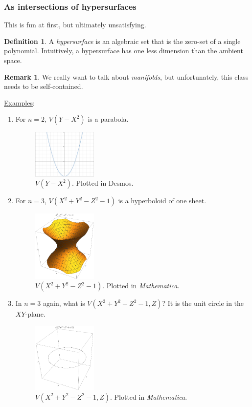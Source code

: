 \documentclass[12pt]{article}
\newcommand{\ita}[1]{\textit{#1}}
\theoremstyle{definition}
\newtheorem{definition}[theorem]{Definition}
\newtheorem*{remark}{Remark}
\begin{document}
\subsubsection{As intersections of hypersurfaces}
This is fun at first, but ultimately unsatisfying.
\begin{definition}
    A \ita{hypersurface} is an algebraic set that is the zero-set of a single polynomial. Intuitively, a hypersurface has one less dimension than the ambient space.
\end{definition}
\begin{remark}
    We really want to talk about \ita{manifolds}, but unfortunately, this class needs to be self-contained.
\end{remark}
\underline{Examples}:
\begin{enumerate}
    \item For $n=2$, $V(Y-X^2)$ is a parabola.
    \begin{figure}[H]
        \centering
        \includegraphics[width=0.3\textwidth]{6.png}
        \caption{$V(Y-X^2)$. Plotted in Desmos.}
    \end{figure}
    \item For $n=3$, $V(X^2+Y^2-Z^2-1)$ is a hyperboloid of one sheet. 
    \begin{figure}[H]
        \centering
        \includegraphics[width=0.3\textwidth]{7.png}
        \caption{$V(X^2+Y^2-Z^2-1)$. Plotted in \ita{Mathematica}.}
    \end{figure}
    \item In $n=3$ again, what is $V(X^2+Y^2-Z^2-1,Z)$? It is the unit circle in the $XY$-plane. 
    \begin{figure}[H]
        \centering
        \includegraphics[width=0.3\textwidth]{8.png}
        \caption{$V(X^2+Y^2-Z^2-1,Z)$. Plotted in \ita{Mathematica}.}
    \end{figure}
\end{enumerate}
\end{document}
